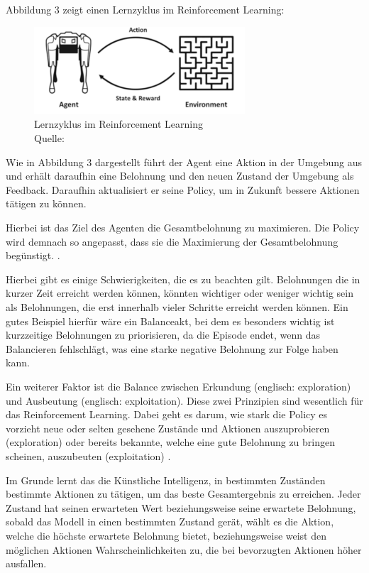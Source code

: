 	Abbildung 3 zeigt einen Lernzyklus im Reinforcement Learning:
\nopagebreak
\begin{figure}[H]
\includegraphics[width=0.7\textwidth]{Bilder/rl} 
\caption[Lernzyklus im Reinforcement Learning]{Lernzyklus im Reinforcement Learning\\ Quelle: \cite{ris-ala_fundamentals_2023}}
\end{figure}

Wie in Abbildung 3 dargestellt führt der Agent eine Aktion in der Umgebung aus und erhält daraufhin eine Belohnung und den neuen Zustand der Umgebung als Feedback. Daraufhin aktualisiert er seine Policy, um in Zukunft bessere Aktionen tätigen zu können.

Hierbei ist das Ziel des Agenten die Gesamtbelohnung zu maximieren. Die Policy wird demnach so angepasst, dass sie die Maximierung der Gesamtbelohnung begünstigt. \cite[S. 12f]{ris-ala_fundamentals_2023}.

Hierbei gibt es einige Schwierigkeiten, die es zu beachten gilt. Belohnungen die in kurzer Zeit erreicht werden können, könnten wichtiger oder weniger wichtig sein als Belohnungen, die erst innerhalb vieler Schritte erreicht werden können. Ein gutes Beispiel hierfür wäre ein Balanceakt, bei dem es besonders wichtig ist kurzzeitige Belohnungen zu priorisieren, da die Episode endet, wenn das Balancieren fehlschlägt, was eine starke negative Belohnung zur Folge haben kann.

Ein weiterer Faktor ist die Balance zwischen Erkundung (englisch: exploration) und Ausbeutung (englisch: exploitation). Diese zwei Prinzipien sind wesentlich für das Reinforcement Learning. Dabei geht es darum, wie stark die Policy es vorzieht neue oder selten gesehene Zustände und Aktionen auszuprobieren (exploration) oder bereits bekannte, welche eine gute Belohnung zu bringen scheinen, auszubeuten (exploitation) \cite[S. 13]{ris-ala_fundamentals_2023}.

Im Grunde lernt das die Künstliche Intelligenz, in bestimmten Zuständen bestimmte Aktionen zu tätigen, um das beste Gesamtergebnis zu erreichen. Jeder Zustand hat seinen erwarteten Wert beziehungsweise seine erwartete Belohnung, sobald das Modell in einen bestimmten Zustand gerät, wählt es die Aktion, welche die höchste erwartete Belohnung bietet, beziehungsweise weist den möglichen Aktionen Wahrscheinlichkeiten zu, die bei bevorzugten Aktionen höher ausfallen.\\


